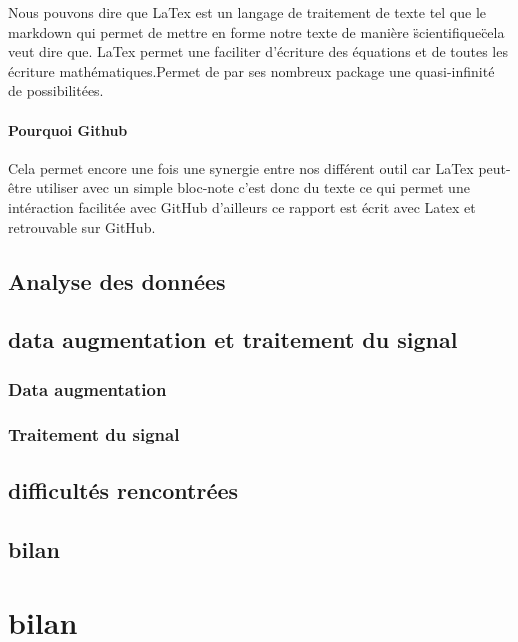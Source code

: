 Nous pouvons dire que LaTex est un langage de traitement de texte tel que le markdown qui permet de mettre en forme notre texte de manière \"scientifique\" cela veut dire que. LaTex permet une faciliter d'écriture des équations et de toutes les écriture mathématiques.Permet de par ses nombreux package une quasi-infinité de possibilitées.

\subsubsection{Pourquoi Github}
Cela permet encore une fois une synergie entre nos différent outil car LaTex peut-être utiliser avec un simple bloc-note c'est donc du texte ce qui permet une intéraction facilitée avec GitHub d'ailleurs ce rapport est écrit avec Latex et retrouvable sur GitHub.

\section{Analyse des données}



\section{data augmentation et traitement du signal}

\subsection{Data augmentation}



\subsection{Traitement du signal}



\section{difficultés rencontrées}



\section{bilan}
\hypertarget{bilan}{%
\chapter{bilan}\label{bilan}}












